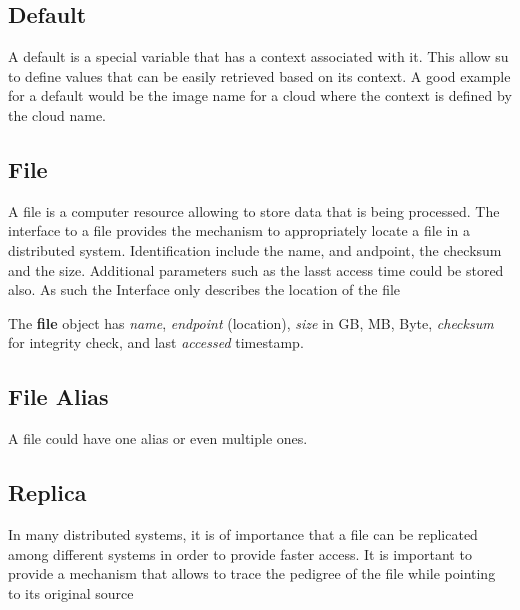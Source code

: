 \documentclass[9pt,twocolumn,twoside]{styles/osajnl}
\begin{document}

\subsection{Default}

A default is a special variable that has a context associated with
it. This allow su to define values that can be easily retrieved based
on its context. A good example for a default would be the image name
for a cloud where the context is defined by the cloud name.


\subsection{File}

A file is a computer resource allowing to store data that is being
processed. The interface to a file provides the mechanism to
appropriately locate a file in a distributed system. Identification
include the name, and andpoint, the checksum and the size. Additional
parameters such as the lasst access time could be stored also. As such
the Interface only describes the location of the file 

The \textbf{file} object has \textit{name}, \textit{endpoint} (location), \textit{size}
in GB, MB, Byte, \textit{checksum} for integrity check, and last
\textit{accessed} timestamp. 


\subsection{File Alias}

A file could have one alias or even multiple ones.


\subsection{Replica}

In many distributed systems, it is of importance that a file can be
replicated among different systems in order to provide faster
access. It is important to provide a mechanism that allows to trace
the pedigree of the file while pointing to its original source 
\end{document}

